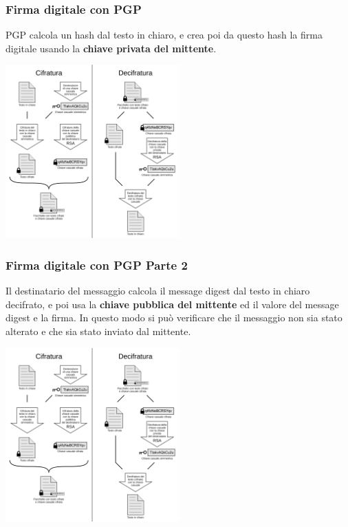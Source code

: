 \begin{frame}
    \frametitle{Firma digitale con PGP}
PGP calcola un hash dal testo in chiaro, e crea poi da questo hash la firma digitale usando la  \textbf{chiave privata del mittente}.
\begin{center}
    \includegraphics[width=0.5\textwidth]{img/1-img/PGP_diagram_IT.png}
\end{center}
\end{frame}

\begin{frame}
    \frametitle{Firma digitale con PGP Parte 2}
Il destinatario del messaggio calcola il message digest dal testo in chiaro decifrato, e poi usa la \textbf{chiave pubblica del mittente} ed il valore del message digest e la firma.
In questo modo si può verificare che il messaggio non sia stato alterato e che sia stato inviato dal mittente.

\begin{center}
    \includegraphics[width=0.5\textwidth]{img/1-img/PGP_diagram_IT.png}
\end{center}
\end{frame}